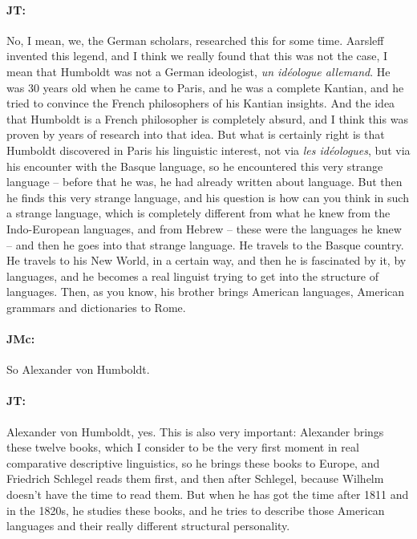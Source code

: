 \documentclass[output=paper]{langscibook}
\begin{document}
\paragraph*{JT:} No, I mean, we, the German scholars, researched this for some time. Aarsleff invented this legend, and I think we really found that this was not the case, I mean that Humboldt was not a German ideologist, \textit{un idéologue allemand}. He was 30 years old when he came to Paris, and he was a complete Kantian, and he tried to convince the French philosophers of his Kantian insights. And the idea that Humboldt is a French philosopher is completely absurd, and I think this was proven by years of research into that idea. But what is certainly right is that Humboldt discovered in Paris his linguistic interest, not via \textit{les idéologues}, but via his encounter with the Basque language, so he encountered this very strange language – before that he was, he had already written about language. But then he finds this very strange language, and his question is how can you think in such a strange language, which is completely different from what he knew from the Indo-European languages, and from Hebrew – these were the languages he knew – and then he goes into that strange language. He travels to the Basque country. He travels to his New World, in a certain way, and then he is fascinated by it, by languages, and he becomes a real linguist trying to get into the structure of languages. Then, as you know, his brother brings American languages, American grammars and dictionaries to Rome.


\paragraph*{JMc:} So Alexander von Humboldt.


\paragraph*{JT:} \begin{sloppypar} Alexander von Humboldt, yes. This is also very important: Alexander brings these twelve books, which I consider to be the very first moment in real comparative descriptive linguistics, so he brings these books to Europe, and Friedrich Schlegel reads them first, and then after Schlegel, because Wilhelm doesn’t have the time to read them. But when he has got the time after 1811 and in the 1820s, he studies these books, and he tries to describe those American languages and their really different structural personality.\end{sloppypar}
\end{document}
